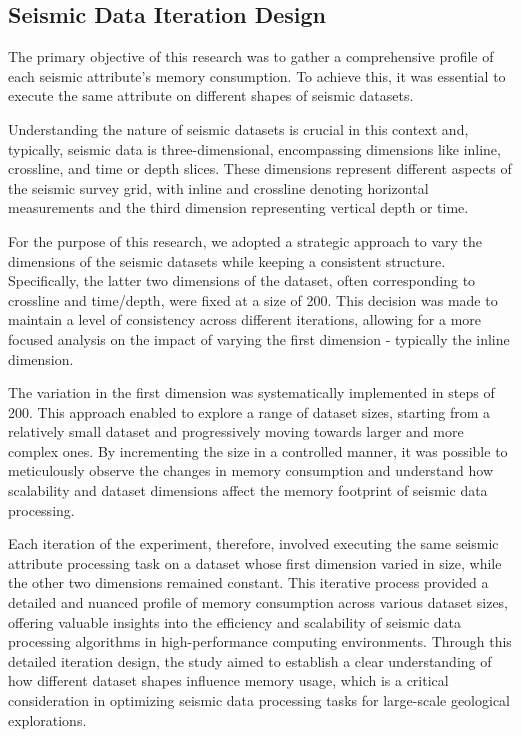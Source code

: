 \subsection{Seismic Data Iteration Design}

The primary objective of this research was to gather a comprehensive profile of each seismic attribute's memory consumption.
To achieve this, it was essential to execute the same attribute on different shapes of seismic datasets.

Understanding the nature of seismic datasets is crucial in this context and, typically, seismic data is three-dimensional, encompassing dimensions like inline, crossline, and time or depth slices.
These dimensions represent different aspects of the seismic survey grid, with inline and crossline denoting horizontal measurements and the third dimension representing vertical depth or time.

For the purpose of this research, we adopted a strategic approach to vary the dimensions of the seismic datasets while keeping a consistent structure.
Specifically, the latter two dimensions of the dataset, often corresponding to crossline and time/depth, were fixed at a size of 200.
This decision was made to maintain a level of consistency across different iterations, allowing for a more focused analysis on the impact of varying the first dimension - typically the inline dimension.

The variation in the first dimension was systematically implemented in steps of 200.
This approach enabled to explore a range of dataset sizes, starting from a relatively small dataset and progressively moving towards larger and more complex ones.
By incrementing the size in a controlled manner, it was possible to meticulously observe the changes in memory consumption and understand how scalability and dataset dimensions affect the memory footprint of seismic data processing.

Each iteration of the experiment, therefore, involved executing the same seismic attribute processing task on a dataset whose first dimension varied in size, while the other two dimensions remained constant.
This iterative process provided a detailed and nuanced profile of memory consumption across various dataset sizes, offering valuable insights into the efficiency and scalability of seismic data processing algorithms in high-performance computing environments.
Through this detailed iteration design, the study aimed to establish a clear understanding of how different dataset shapes influence memory usage, which is a critical consideration in optimizing seismic data processing tasks for large-scale geological explorations.

